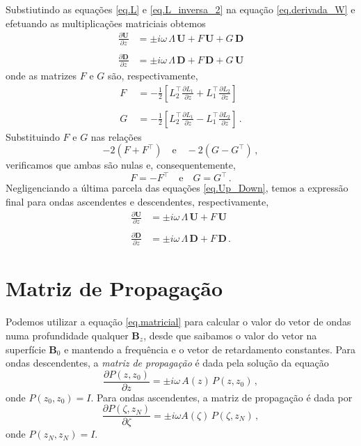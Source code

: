 Substiutindo as equa\c{c}\~oes \ref{eq.L} e \ref{eq.L_inversa_2} na equa\c{c}\~ao \ref{eq.derivada_W} e efetuando as multiplica\c{c}\~oes matriciais obtemos
\begin{align}\label{eq.Up_Down}\nonumber
\frac{\partial\mathbf{U}}{\partial z}&=\pm i\omega\,\Lambda\,\mathbf{U}+F\,\mathbf{U}+G\,\mathbf{D}\\\quad\\\nonumber
\frac{\partial\mathbf{D}}{\partial z}&=\pm i\omega\,\Lambda\,\mathbf{D}+F\,\mathbf{D}+G\,\mathbf{U}
\end{align}
onde as matrizes $F$ e $G$ s\~ao, respectivamente,
\begin{align*}
F&=-\frac{1}{2}\left[L_2^\top\frac{\partial L_1}{\partial z}+L_1^\top\frac{\partial L_2}{\partial z}\right]\\\quad\\
G&=-\frac{1}{2}\left[L_2^\top\frac{\partial L_1}{\partial z}-L_1^\top\frac{\partial L_2}{\partial z}\right]\,.
\end{align*}
Substituindo $F$ e $G$ nas rela\c{c}\~oes
\begin{equation*}
-2(F+F^\top)\quad\text{e}\quad-2(G-G^\top)\,,
\end{equation*}
verificamos que ambas s\~ao nulas e, consequentemente,
\begin{equation*}
F=-F^\top\quad\text{e}\quad G=G^\top\,.
\end{equation*}
Negligenciando a \'ultima parcela das equa\c{c}\~oes \ref{eq.Up_Down}, temos a express\~ao final para ondas ascendentes e descendentes, respectivamente,
\begin{align}\label{eq.Up_Down_2}\nonumber
\frac{\partial\mathbf{U}}{\partial z}&=\pm i\omega\,\Lambda\,\mathbf{U}+F\,\mathbf{U}\\\quad\\\nonumber
\frac{\partial\mathbf{D}}{\partial z}&=\pm i\omega\,\Lambda\,\mathbf{D}+F\,\mathbf{D}\,.
\end{align}

\section{Matriz de Propaga\c{c}\~ao}

Podemos utilizar a equa\c{c}\~ao \ref{eq.matricial} para calcular o valor do vetor de ondas numa profundidade qualquer $\mathbf{B}_z$, desde que saibamos o valor do vetor na superf\'icie $\mathbf{B}_0$ e mantendo a frequ\^encia e o vetor de retardamento constantes. Para ondas descendentes, a \textit{matriz de propaga\c{c}\~ao} \'e dada pela solu\c{c}\~ao da equa\c{c}\~ao 
\begin{equation}\label{eq.matriz_propagacao}
\frac{\partial P(z,z_0)}{\partial z}=\pm i\omega\,A(z)\,P(z,z_0)\,,
\end{equation}
onde $P(z_0,z_0)=I$. Para ondas ascendentes, a matriz de propaga\c{c}\~ao \'e dada por
\begin{equation*}
\frac{\partial P(\zeta,z_N)}{\partial \zeta}=\pm i\omega A(\zeta)\,P(\zeta,z_N)\,,
\end{equation*}
onde $P(z_N,z_N)=I$.

